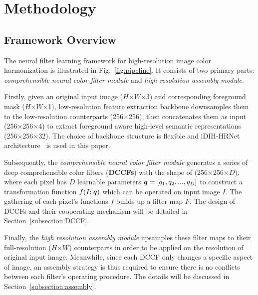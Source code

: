 \documentclass[runningheads]{llncs}
\begin{document}
    
    
    \section{Methodology}
    
    \subsection{Framework Overview}
    
    
    
    The neural filter learning framework for high-resolution image color harmonization is illustrated in Fig.~\ref{fig:pipeline}.
It consists of two primary parts: \textit{comprehensible neural color filter module} and \textit{high resolution assembly module}.
    
    Firstly, given an original input image ($H$$\times$$W$$\times$3) and corresponding foreground mask ($H$$\times$$W$$\times$1), low-resolution feature extraction backbone downsamples them to the low-resolution counterparts (256$\times$256), then concatenates them as input (256$\times$256$\times$4) to extract foreground aware high-level semantic representations (256$\times$256$\times$32).
    The choice of backbone structure is flexible and iDIH-HRNet architecture~\cite{sofiiuk2021foreground} is used in this paper.


Subsequently, the \textit{comprehensible neural color filter module} generates a series of deep comprehensible color filters (\textbf{DCCFs}) with the shape of (256$\times$256$\times$$D$), where each pixel has $D$ learnable parameters $\textbf{\textit{q}}=[q_1, q_2, ..., q_D]$ to construct a transformation function $f(I;\textbf{\textit{q}})$ which can be operated on input image $I$. 
    The gathering of each pixel's functions $f$ builds up a filter map $F$.
    The design of DCCFs and their cooperating mechanism will be detailed in Section~\ref{subsection:DCCF}.
    
Finally, the \textit{high resolution assembly module} upsamples these filter maps to their full-resolution ($H$$\times$$W$) counterparts in order to be applied on the resolution of original input image. 
    Meanwhile, since each DCCF only changes a specific aspect of image, an assembly strategy is thus required to ensure there is no conflicts between each filter's operating procedure.
    The details will be discussed in Section~\ref{subsection:assembly}.
    
    
\end{document}
